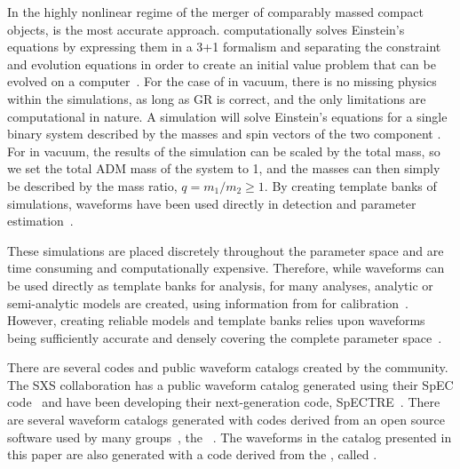\documentclass[
twocolumn,prd,
showpacs,
nofootinbib,
amsmath,amssymb,
superscriptaddress]{revtex4-1}
\begin{document}
In the highly nonlinear regime of the merger of comparably massed compact objects, \nr{} is the most accurate approach.
\nr{} computationally solves Einstein's equations by expressing them in a 3+1 formalism and separating the constraint and evolution equations in order to create an initial value problem that can be evolved on a computer~\cite{Baumgarte:1998te, baumgarte_shapiro_2010, PhysRevD.59.024007}.
For the case of  in vacuum, there is no missing physics within the simulations, as long as GR is correct, and the only limitations are computational in nature. 
A \nr{} simulation will solve Einstein's equations for a single binary system described by the masses and spin vectors of the two component .
For  in vacuum,  the results of the simulation can be scaled by the total mass, so we set the total ADM mass of the system to 1, and the masses can then simply be described by the mass ratio, $q=m_1/m_2 \geq 1$.
By creating template banks of \nr{} simulations, \nr{} waveforms have been used directly in \gw{} detection and parameter estimation~\cite{Lange:2017wki, LIGOScientific:2016kms, Gayathri:2020coq, CalderonBustillo:2022cja}.

These simulations are placed discretely throughout the parameter space and are time consuming and computationally expensive.
Therefore, while \nr{} waveforms can be used directly as template banks for \gw{} analysis, for many analyses, analytic or semi-analytic models are created, using information from \nr{} for calibration~\cite{Varma:2019csw, Bohe:2016gbl,Khan:2015jqa, Blackman:2017pcm, Husa:2015iqa, Taracchini:2013rva,Hannam:2013oca, Santamaria:2010yb, Nakano:2011pb, Pratten:2020ceb}. 
However, creating reliable models and template banks relies upon \nr{} waveforms being sufficiently accurate and densely covering the complete parameter space~\cite{Ferguson:2020xnm, Purrer:2019jcp}.

There are several \nr{} codes and public waveform catalogs created by the \nr{} community.
The SXS collaboration has a public waveform catalog generated using their SpEC code~\cite{2013PhRvL.111x1104M, 2019CQGra..36s5006B} and have been developing their next-generation code, SpECTRE~\cite{deppe_nils_2021_5083825}.  
There are several waveform catalogs generated with codes derived from an open source software used by many \nr{} groups~\cite{Loffler:2011ay}, the \etk{}~\cite{Jani:2016wkt,Healy:2017psd, Healy:2019jyf, Healy:2022wdn, PhysRevD.102.104018}. The waveforms in the catalog presented in this paper are also  generated with a code derived from the \etk{},  called \maya{}.
\end{document}
